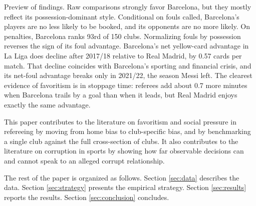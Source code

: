 Preview of findings. Raw comparisons strongly favor Barcelona, but they mostly reflect its possession-dominant style. Conditional on fouls called, Barcelona's players are no less likely to be booked, and its opponents are no more likely. On penalties, Barcelona ranks 93rd of 150 clubs. Normalizing fouls by possession reverses the sign of its foul advantage. Barcelona's net yellow-card advantage in La Liga does decline after 2017/18 relative to Real Madrid, by 0.57 cards per match. That decline coincides with Barcelona's sporting and financial crisis, and its net-foul advantage breaks only in 2021/22, the season Messi left. The clearest evidence of favoritism is in stoppage time: referees add about 0.7 more minutes when Barcelona trails by a goal than when it leads, but Real Madrid enjoys exactly the same advantage.

This paper contributes to the literature on favoritism and social pressure in refereeing by moving from home bias to club-specific bias, and by benchmarking a single club against the full cross-section of clubs. It also contributes to the literature on corruption in sports \citep{boeri2011match} by showing how far observable decisions can and cannot speak to an alleged corrupt relationship.

The rest of the paper is organized as follows. Section \ref{sec:data} describes the data. Section \ref{sec:strategy} presents the empirical strategy. Section \ref{sec:results} reports the results. Section \ref{sec:conclusion} concludes.
